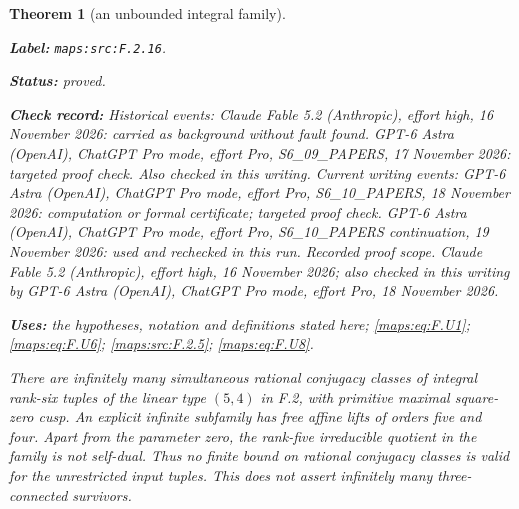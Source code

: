 \documentclass[11pt,a4paper]{article}
\newtheorem{theorem}{Theorem}[section]
\theoremstyle{definition}
\newcommand{\StatementRecord}[4]{\par\smallskip\begingroup\upshape\raggedright\noindent\textbf{Label:} \nolinkurl{#1}.\par\noindent\textbf{Status:} #2.\par\noindent\textbf{Check record:} #3.\par\noindent\textbf{Uses:} #4.\par\endgroup\smallskip}
\begin{document}
\begin{theorem}[an unbounded integral family]\label{maps:src:F.2.16}
\StatementRecord{maps:src:F.2.16}{proved}{Historical events: Claude Fable 5.2 (Anthropic), effort high, 16 November 2026: carried as background without fault found. GPT-6 Astra (OpenAI), ChatGPT Pro mode, effort Pro, S6\_09\_PAPERS, 17 November 2026: targeted proof check. Also checked in this writing. Current writing events: GPT-6 Astra (OpenAI), ChatGPT Pro mode, effort Pro, S6\_10\_PAPERS, 18 November 2026: computation or formal certificate; targeted proof check. GPT-6 Astra (OpenAI), ChatGPT Pro mode, effort Pro, S6\_10\_PAPERS continuation, 19 November 2026: used and rechecked in this run. \emph{Recorded proof scope.} Claude Fable 5.2 (Anthropic), effort high, 16 November 2026; also checked in this writing by GPT-6 Astra (OpenAI), ChatGPT Pro mode, effort Pro, 18 November 2026}{the hypotheses, notation and definitions stated here; \cref{maps:eq:F.U1}; \cref{maps:eq:F.U6}; \cref{maps:src:F.2.5}; \cref{maps:eq:F.U8}}


There are infinitely many simultaneous rational conjugacy classes
of integral rank-six tuples of the linear type $(5,4)$ in F.2,
with primitive maximal square-zero cusp.  An explicit infinite
subfamily has free affine lifts of orders five and four.
Apart from the parameter zero, the rank-five irreducible quotient
in the family is not self-dual.  Thus no finite bound on rational
conjugacy classes is valid for the unrestricted input tuples.
This does not assert infinitely many three-connected survivors.

\end{theorem}
\end{document}
